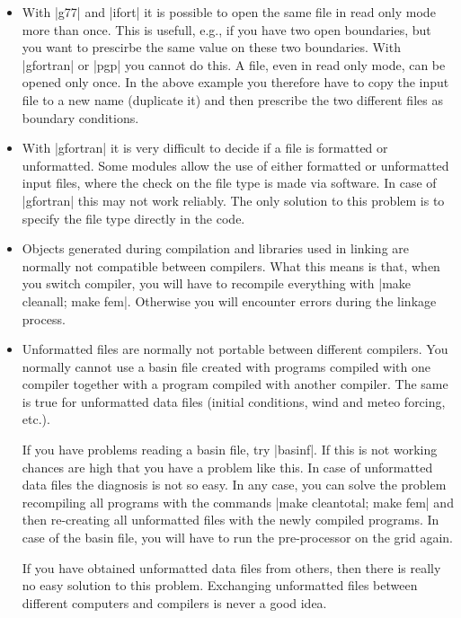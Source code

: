 \begin{itemize}

\item With |g77| and |ifort| it is possible to open the same file in
read only mode more than once. This is usefull, e.g., if you have two
open boundaries, but you want to prescirbe the same value on these
two boundaries. With |gfortran| or |pgp| you cannot do this. A file,
even in read only mode, can be opened only once. In the above example
you therefore have to copy the input file to a new name (duplicate it)
and then prescribe the two different files as boundary conditions.

\item With |gfortran| it is very difficult to decide if a file is
formatted or unformatted. Some modules allow the use of either formatted
or unformatted input files, where the check on the file type is made
via software. In case of |gfortran| this may not work reliably. The only
solution to this problem is to specify the file type directly in the code.

\item Objects generated during compilation and libraries used in linking
are normally not compatible between compilers. What this means is that,
when you switch compiler, you will have to recompile everything with
|make cleanall; make fem|. Otherwise you will encounter errors during
the linkage process.

\item Unformatted files are normally not portable between different
compilers. You normally cannot use a basin file created with programs
compiled with one compiler together with a program compiled with another
compiler. The same is true for unformatted data files (initial conditions,
wind and meteo forcing, etc.).

If you have problems reading a basin file, try |basinf|. If this is not
working chances are high that you have a problem like this.  In case
of unformatted data files the diagnosis is not so easy. In any case,
you can solve the problem recompiling all programs with the commands
|make cleantotal; make fem| and then re-creating all unformatted files
with the newly compiled programs. In case of the basin file, you will
have to run the pre-processor on the grid again.

If you have obtained unformatted data files from others, then there is
really no easy solution to this problem. Exchanging unformatted files
between different computers and compilers is never a good idea.


\end{itemize}
